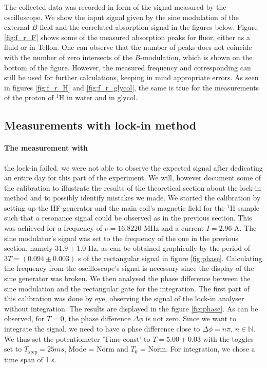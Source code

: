 The collected data was recorded in form of the signal measured by the oscilloscope. 
We show the input signal given by the sine modulation of the external $B$-field and 
the correlated absorption signal in the figures below. Figure \ref{fig:f_r_F} shows 
some of the measured absorption peaks for fluor, either as a fluid or in Teflon. 
One can observe that the number of peaks does not coincide with the number of zero 
intersects of the $B$-modulation, which is shown on the bottom of the figure. 
However, the measured frequency and corresponding can still be used for further calculations, 
keeping in mind appropriate errors. 
As seen in figures \ref{fig:f_r_H} and \ref{fig:f_r_glycol}, the same is true for 
the measurements of the proton of $^1$H in water and in glycol.

\FloatBarrier

\subsection{Measurements with lock-in method}
\paragraph{The measurement with}
the lock-in failed. we were not able to observe the expected signal 
after dedicating an entire day for this part of the experiment. We will, however document some 
of the calibration to illustrate the results of the theoretical section about the lock-in method 
and to possibly identify mistakes we made. 
We started the calibration by setting up the HF-generator and the main coil's magnetic field 
for the $^1$H sample such that a resonance signal could be observed as in the previous section.
This was achieved for a frequency of $\nu = 16.8220$ MHz and a current $I = 2.96$ A. 
The sine modulator's signal was set to the frequency of the one in the previous section, 
namely $31.9 \pm 1.0$ Hz, as can be obtained graphically by the period of $3T = (0.094 \pm 0.003)$ s 
of the rectangular signal in figure \ref{fig:phase}. Calculating the frequency from the 
oscilloscope's signal is necessary since the display of the sine generator was broken. 
We then analysed the phase difference between the sine modulation and the rectangular gate 
for the integration. The first part of this calibration was done by eye, observing the 
signal of the lock-in analyser without integration. The results are displayed in the figure
\ref{fig:phase}. As can be observed, for $T = 0$, the phase difference $\Delta \phi$ is not zero. 
Since we want to integrate the signal, we need to have a phse difference close to $\Delta \phi = n \pi$, 
$n \in \mathbb{N}$. We thus set the potentiometer 'Time const' to $T = 5.00 \pm 0.03$ with the 
toggles set to $T_\mathrm{step} = 25ms$, Mode = Norm and $T_0$ = Norm. For integration, we 
chose a time span of 1 s. 


